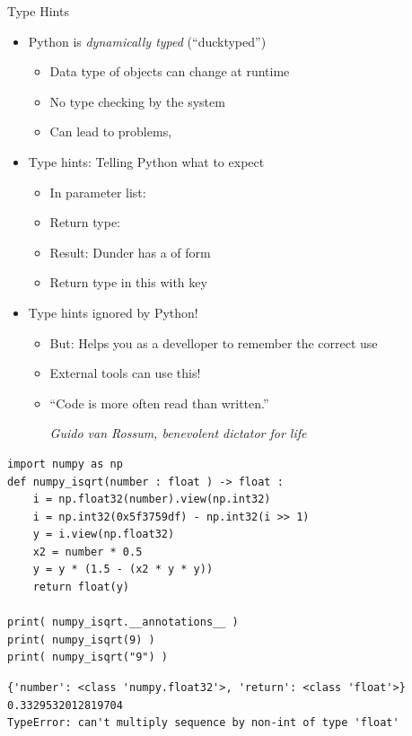\begin{frame}{Type Hints}
%
\begin{itemize}
\item Python is \emph{dynamically typed} (\enquote{ducktyped})
	\begin{itemize}
	\item Data type of objects can change at runtime
	\item No type checking by the system
	\item Can lead to problems, \eg {}
	\end{itemize}
\item Type hints: Telling Python what to expect
	\begin{itemize}
	\item In parameter list: 
	\item Return type: 
	\item Result: Dunder  has a  of form 
	\item Return type in this  with key 
	\end{itemize}
\item Type hints ignored by Python!
	\begin{itemize}
	\item But: Helps you as a develloper to remember the correct use
	\item External tools can use this!
	\item \enquote{Code is more often read than written.}
		\begin{flushright}
		\emph{Guido van Rossum, benevolent dictator for life}
		\end{flushright}
	\end{itemize}
\end{itemize}
%
\end{frame}


\begin{frame}[fragile]
%
\begin{codebox}
\begin{verbatim}
import numpy as np
def numpy_isqrt(number : float ) -> float :
    i = np.float32(number).view(np.int32)
    i = np.int32(0x5f3759df) - np.int32(i >> 1)
    y = i.view(np.float32)
    x2 = number * 0.5
    y = y * (1.5 - (x2 * y * y))
    return float(y)

print( numpy_isqrt.__annotations__ )
print( numpy_isqrt(9) )
print( numpy_isqrt("9") )
\end{verbatim}
\end{codebox}
%
\begin{cmdbox}
\begin{verbatim}
{'number': <class 'numpy.float32'>, 'return': <class 'float'>}
0.3329532012819704
TypeError: can't multiply sequence by non-int of type 'float'
\end{verbatim}
\end{cmdbox}
%
\end{frame}

